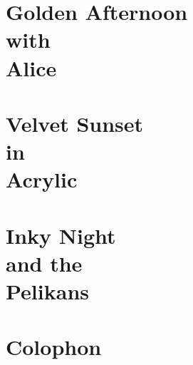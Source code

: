\documentclass[12pt]{memoir}
\begin{document}
\chapter[Golden Afternoon with Alice]
{Golden Afternoon\\
with\\
Alice}
\lipsum[81-100]

\chapter[Velvet Sunset in Acrylic]
{Velvet Sunset\\
in\\
Acrylic}
\lipsum[101-120]

\chapter[Inky Night and the Pelikans]
{Inky Night\\
and the\\
Pelikans}
\lipsum[121-140]

\backmatter
\appendix

\chapter{Colophon}
\thispagestyle{empty}
\lipsum[141-144]
\end{document}
